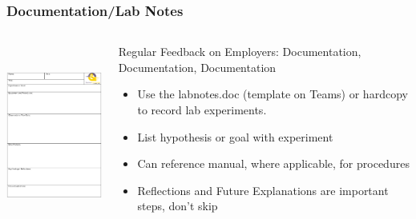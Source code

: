 \documentclass{beamer}
\begin{document}
\begin{frame}\frametitle{Documentation/Lab Notes}
\begin{columns}
\begin{column}{5cm}
\begin{center}
\includegraphics[height=6cm]{fig/labnotes.png}
\end{center}
\end{column}
\begin{column}{6cm}
Regular Feedback on Employers: Documentation, Documentation, Documentation
\begin{itemize}
\item Use the labnotes.doc (template on Teams) or hardcopy to record lab experiments.
\item List hypothesis or goal with experiment
\item Can reference manual, where applicable, for procedures
\item Reflections and Future Explanations are important steps, don't skip
\end{itemize}
\end{column}
\end{columns}
\end{frame}
\end{document}
